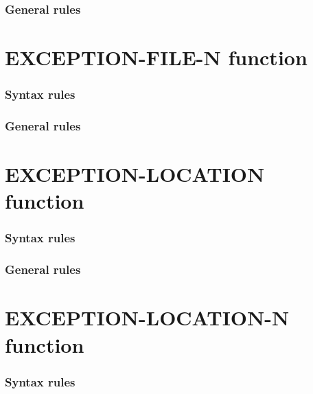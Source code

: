 \subsubsection{General rules}

\section{EXCEPTION-FILE-N function}

\begin{syntax}
\end{syntax}

\subsubsection{Syntax rules}

\subsubsection{General rules}

\section{EXCEPTION-LOCATION function}

\begin{syntax}
   
\end{syntax}

\subsubsection{Syntax rules}

\subsubsection{General rules}

\section{EXCEPTION-LOCATION-N function}

\begin{syntax}
\end{syntax}

\subsubsection{Syntax rules}

